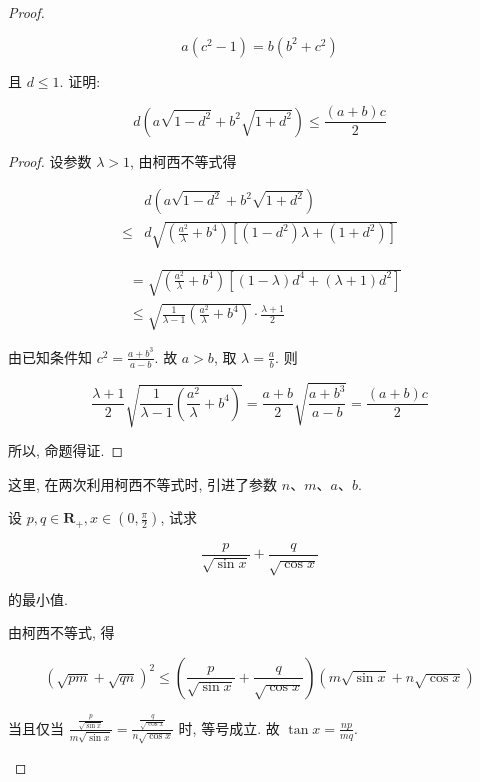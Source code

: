 \begin{proof}
\begin{example}
\begin{solution}
\begin{note}
\begin{solution}
\begin{example}
	$$
	a\left(c^{2}-1\right)=b\left(b^{2}+c^{2}\right)
	$$
	
	且 $d \leqslant 1$. 证明:
	
	$$
	d\left(a \sqrt{1-d^{2}}+b^{2} \sqrt{1+d^{2}}\right) \leqslant \frac{(a+b) c}{2}
	$$
\end{example}
\begin{proof}
	设参数 $\lambda>1$, 由柯西不等式得
	
	$$
	\begin{aligned}
	& d\left(a \sqrt{1-d^{2}}+b^{2} \sqrt{1+d^{2}}\right) \\
	\leqslant & d \sqrt{\left(\frac{a^{2}}{\lambda}+b^{4}\right)\left[\left(1-d^{2}\right) \lambda+\left(1+d^{2}\right)\right]}
	\end{aligned}
	$$
	
	$$
	\begin{aligned}
	& =\sqrt{\left(\frac{a^{2}}{\lambda}+b^{4}\right)\left[(1-\lambda) d^{4}+(\lambda+1) d^{2}\right]} \\
	& \leqslant \sqrt{\frac{1}{\lambda-1}\left(\frac{a^{2}}{\lambda}+b^{4}\right)} \cdot \frac{\lambda+1}{2}
	\end{aligned}
	$$
	
	由已知条件知 $c^{2}=\frac{a+b^{3}}{a-b}$. 故 $a>b$, 取 $\lambda=\frac{a}{b}$. 则
	
	$$
	\frac{\lambda+1}{2} \sqrt{\frac{1}{\lambda-1}\left(\frac{a^{2}}{\lambda}+b^{4}\right)}=\frac{a+b}{2} \sqrt{\frac{a+b^{3}}{a-b}}=\frac{(a+b) c}{2}
	$$
	
	所以, 命题得证.
\end{proof}
\begin{note}
	这里, 在两次利用柯西不等式时, 引进了参数 $n 、 m 、 a 、 b$.
\end{note}

\begin{example}
	设 $p, q \in \mathbf{R}_{+}, x \in\left(0, \frac{\pi}{2}\right)$, 试求
	
	$$
	\frac{p}{\sqrt{\sin x}}+\frac{q}{\sqrt{\cos x}}
	$$
	
	的最小值.
\end{example}
\begin{solution}
	由柯西不等式, 得
	
	$$
	(\sqrt{p m}+\sqrt{q n})^{2} \leqslant\left(\frac{p}{\sqrt{\sin x}}+\frac{q}{\sqrt{\cos x}}\right)(m \sqrt{\sin x}+n \sqrt{\cos x})
	$$
	
	当且仅当 $\frac{\frac{p}{\sqrt{\sin x}}}{m \sqrt{\sin x}}=\frac{\frac{q}{\sqrt{\cos x}}}{n \sqrt{\cos x}}$ 时, 等号成立. 故 $\tan x=\frac{n p}{m q}$.
	

\end{solution}
\end{solution}
\end{note}
\end{solution}
\end{example}
\end{proof}
